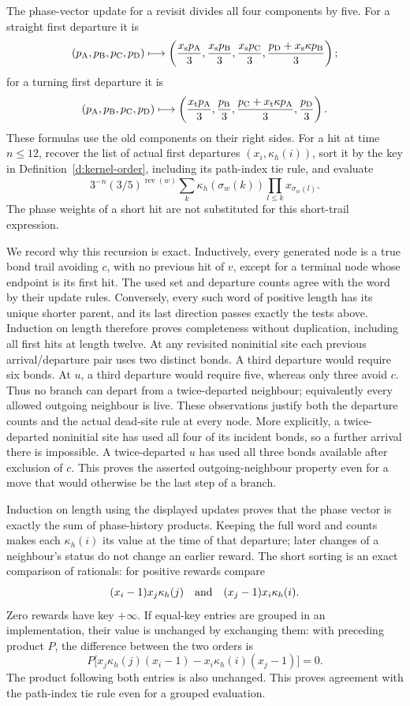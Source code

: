 The phase-vector update for a revisit divides all four components
by five. For a straight first departure it is
\[
 (p_{\rm A},p_{\rm B},p_{\rm C},p_{\rm D})\longmapsto
 \left(\frac{x_{\rm s}p_{\rm A}}3,
       \frac{x_{\rm s}p_{\rm B}}3,
       \frac{x_{\rm s}p_{\rm C}}3,
       \frac{p_{\rm D}+x_{\rm s}\kappa p_{\rm B}}3\right);
\]
for a turning first departure it is
\[
 (p_{\rm A},p_{\rm B},p_{\rm C},p_{\rm D})\longmapsto
 \left(\frac{x_{\rm t}p_{\rm A}}3,
       \frac{p_{\rm B}}3,
       \frac{p_{\rm C}+x_{\rm t}\kappa p_{\rm A}}3,
       \frac{p_{\rm D}}3\right).
\]
These formulas use the old components on their right sides.
For a hit at time \(n\le12\), recover the list of actual first
departures \((x_i,\kappa_h(i))\), sort it by the key in
Definition~\ref{d:kernel-order}, including its path-index tie rule,
and evaluate
\[
 3^{-n}(3/5)^{\operatorname{rev}(w)}
       \sum_k\kappa_h(\sigma_w(k))\prod_{l\le k}x_{\sigma_w(l)}.
\]
The phase weights of a short hit are not substituted for this
short-trail expression.

We record why this recursion is exact. Inductively, every generated
node is a true bond trail avoiding \(c\), with no previous hit of
\(v\), except for a terminal node whose endpoint is its first
hit. The used set and departure counts agree with the word by
their update rules. Conversely, every such word of positive length
has its unique shorter parent, and its last direction passes
exactly the tests above. Induction on length therefore proves
completeness without duplication, including all first hits at
length twelve. At any revisited noninitial site each previous
arrival/departure pair uses two distinct bonds. A third departure
would require six bonds. At \(u\), a third departure would require
five, whereas only three avoid \(c\). Thus no branch can depart
from a twice-departed neighbour; equivalently every allowed outgoing
neighbour is live. These observations justify both the departure
counts and the actual dead-site rule at every node. More explicitly,
a twice-departed noninitial site has used all four of its incident
bonds, so a further arrival there is impossible. A twice-departed
\(u\) has used all three bonds available after exclusion of \(c\).
This proves the asserted outgoing-neighbour property even for a
move that would otherwise be the last step of a branch.

Induction on length using the displayed updates proves that the
phase vector is exactly the sum of phase-history products. Keeping
the full word and counts makes each \(\kappa_h(i)\) its value at
the time of that departure; later changes of a neighbour's status
do not change an earlier reward. The short sorting is an exact
comparison of rationals: for positive rewards compare
\[
 (x_i-1)x_j\kappa_h(j)\quad\hbox{and}\quad
 (x_j-1)x_i\kappa_h(i).
\]
Zero rewards have key \(+\infty\). If equal-key entries are grouped
in an implementation, their value is unchanged by exchanging
them: with preceding product \(P\), the difference between the
two orders is
\[
 P\bigl[x_j\kappa_h(j)(x_i-1)
         -x_i\kappa_h(i)(x_j-1)\bigr]=0.
\]
The product following both entries is also unchanged. This proves
agreement with the path-index tie rule even for a grouped evaluation.

